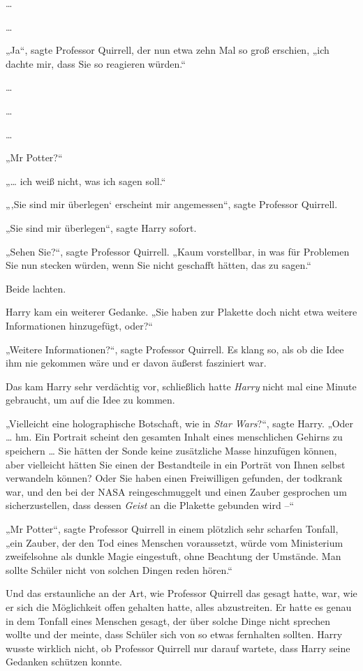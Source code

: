{…

…

„Ja“, sagte Professor Quirrell, der nun etwa zehn Mal so groß erschien, „ich dachte mir, dass Sie so reagieren würden.“

…

…

…

„Mr Potter?“

„… ich weiß nicht, was ich sagen soll.“

„‚Sie sind mir überlegen` erscheint mir angemessen“, sagte Professor Quirrell.

„Sie sind mir überlegen“, sagte Harry sofort.

„Sehen Sie?“, sagte Professor Quirrell. „Kaum vorstellbar, in was für Problemen Sie nun stecken würden, wenn Sie nicht geschafft hätten, das zu sagen.“

Beide lachten.

Harry kam ein weiterer Gedanke. „Sie haben zur Plakette doch nicht etwa weitere Informationen hinzugefügt, oder?“

„Weitere Informationen?“, sagte Professor Quirrell. Es klang so, als ob die Idee ihm nie gekommen wäre und er davon äußerst fasziniert war.

Das kam Harry sehr verdächtig vor, schließlich hatte \emph{Harry} nicht mal eine Minute gebraucht, um auf die Idee zu kommen.

„Vielleicht eine holographische Botschaft, wie in \emph{Star Wars}?“, sagte Harry. „Oder … hm. Ein Portrait scheint den gesamten Inhalt eines menschlichen Gehirns zu speichern … Sie hätten der Sonde keine zusätzliche Masse hinzufügen können, aber vielleicht hätten Sie einen der Bestandteile in ein Porträt von Ihnen selbst verwandeln können? Oder Sie haben einen Freiwilligen gefunden, der todkrank war, und den bei der NASA reingeschmuggelt und einen Zauber gesprochen um sicherzustellen, dass dessen \emph{Geist} an die Plakette gebunden wird --“

„Mr Potter“, sagte Professor Quirrell in einem plötzlich sehr scharfen Tonfall, „ein Zauber, der den Tod eines Menschen voraussetzt, würde vom Ministerium zweifelsohne als dunkle Magie eingestuft, ohne Beachtung der Umstände. Man sollte Schüler nicht von solchen Dingen reden hören.“

Und das erstaunliche an der Art, wie Professor Quirrell das gesagt hatte, war, wie er sich die Möglichkeit offen gehalten hatte, alles abzustreiten. Er hatte es genau in dem Tonfall eines Menschen gesagt, der über solche Dinge nicht sprechen wollte und der meinte, dass Schüler sich von so etwas fernhalten sollten. Harry wusste wirklich nicht, ob Professor Quirrell nur darauf wartete, dass Harry seine Gedanken schützen konnte.

}
